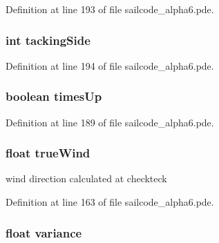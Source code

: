 \-Definition at line 193 of file sailcode\-\_\-alpha6.\-pde.

\hypertarget{group__group1_gabdfa4a25e22806c47eebd4c9826ef7a6}{
\subsubsection[{tacking\-Side}]{\setlength{\rightskip}{0pt plus 5cm}int {\bf tacking\-Side}}}
\label{group__group1_gabdfa4a25e22806c47eebd4c9826ef7a6}


\-Definition at line 194 of file sailcode\-\_\-alpha6.\-pde.

\hypertarget{group__group1_gaf453f5fa6c0df67707ca308a2fc80ca1}{
\subsubsection[{times\-Up}]{\setlength{\rightskip}{0pt plus 5cm}boolean {\bf times\-Up}}}
\label{group__group1_gaf453f5fa6c0df67707ca308a2fc80ca1}


\-Definition at line 189 of file sailcode\-\_\-alpha6.\-pde.

\hypertarget{group__group1_gaea221e98c9a7c4e63325dc52ab83c14d}{
\subsubsection[{true\-Wind}]{\setlength{\rightskip}{0pt plus 5cm}float {\bf true\-Wind}}}
\label{group__group1_gaea221e98c9a7c4e63325dc52ab83c14d}


wind direction calculated at checkteck 



\-Definition at line 163 of file sailcode\-\_\-alpha6.\-pde.

\hypertarget{group__group1_gaec967762d2c44e3594070dca470ae334}{
\subsubsection[{variance}]{\setlength{\rightskip}{0pt plus 5cm}float {\bf variance}}}
\label{group__group1_gaec967762d2c44e3594070dca470ae334}



